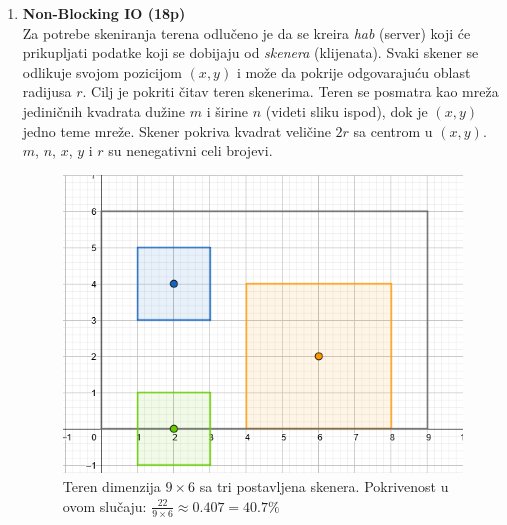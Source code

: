 \documentclass[]{article}
\begin{document}
\begin{enumerate}
  
\item \textbf{Non-Blocking IO (18p)}
\\Za potrebe skeniranja terena odlu\v{c}eno je da se kreira \emph{hab} (server) koji \'c{}e prikupljati podatke koji se dobijaju od \emph{skenera} (klijenata). Svaki skener se odlikuje svojom pozicijom $(x,y)$ i mo\v{z}e da pokrije odgovaraju\'c{}u oblast radijusa $r$. Cilj je pokriti \v{c}itav teren skenerima. Teren se posmatra kao mre\v{z}a jedini\v{c}nih kvadrata du\v{z}ine $m$ i \v{s}irine $n$ (videti sliku ispod), dok je $(x,y)$ jedno teme mre\v{z}e. Skener pokriva kvadrat veli\v{c}ine $2r$ sa centrom u $(x,y)$. $m$, $n$, $x$, $y$ i $r$ su nenegativni celi brojevi.

\begin{figure}[h!]
  \centering
  \includegraphics[scale=0.6]{images/terrain.png}
  \caption{Teren dimenzija $9 \times 6$ sa tri postavljena skenera. Pokrivenost u ovom slu\v{c}aju: $\frac{22}{9 \times 6} \approx 0.407 = 40.7\%$}
\end{figure}


\end{enumerate}
\end{document}
